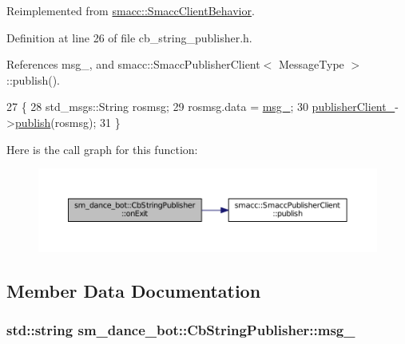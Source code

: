 Reimplemented from \hyperlink{classsmacc_1_1SmaccClientBehavior_ac0cd72d42bd00425362a97c9803ecce5}{smacc\+::\+Smacc\+Client\+Behavior}.



Definition at line 26 of file cb\+\_\+string\+\_\+publisher.\+h.



References msg\+\_\+, and smacc\+::\+Smacc\+Publisher\+Client$<$ Message\+Type $>$\+::publish().


\begin{DoxyCode}
27     \{
28         std\_msgs::String rosmsg;
29         rosmsg.data = \hyperlink{classsm__dance__bot_1_1CbStringPublisher_a57ebf1bedad677d9a4b40b8df271a904}{msg\_};
30         \hyperlink{classsm__dance__bot_1_1CbStringPublisher_a3444c52fae1bd6d7da8c16c894050b2b}{publisherClient\_}->\hyperlink{classsmacc_1_1SmaccPublisherClient_aa635210d9104a5b6f3ea15cb2bf16518}{publish}(rosmsg);
31     \}
\end{DoxyCode}


Here is the call graph for this function\+:
\nopagebreak
\begin{figure}[H]
\begin{center}
\leavevmode
\includegraphics[width=350pt]{classsm__dance__bot_1_1CbStringPublisher_a487d8302e60f01401a7d189382ba5f73_cgraph}
\end{center}
\end{figure}




\subsection{Member Data Documentation}
\subsubsection[{\texorpdfstring{msg\+\_\+}{msg_}}]{\setlength{\rightskip}{0pt plus 5cm}std\+::string sm\+\_\+dance\+\_\+bot\+::\+Cb\+String\+Publisher\+::msg\+\_\+}\hypertarget{classsm__dance__bot_1_1CbStringPublisher_a57ebf1bedad677d9a4b40b8df271a904}{}\label{classsm__dance__bot_1_1CbStringPublisher_a57ebf1bedad677d9a4b40b8df271a904}


